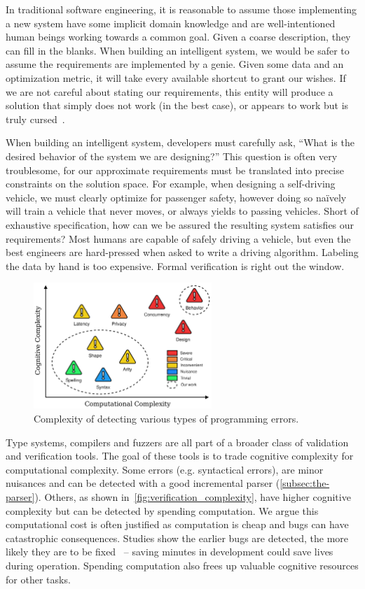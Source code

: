 In traditional software engineering, it is reasonable to assume those implementing a new system have some implicit domain knowledge and are well-intentioned human beings working towards a common goal. Given a coarse description, they can fill in the blanks. When building an intelligent system, we would be safer to assume the requirements are implemented by a genie. Given some data and an optimization metric, it will take every available shortcut to grant our wishes. If we are not careful about stating our requirements, this entity will produce a solution that simply does not work (in the best case), or appears to work but is truly cursed~\citep{bellman1957dynamic}.

When building an intelligent system, developers must carefully ask, ``What is the desired behavior of the system we are designing?'' This question is often very troublesome, for our approximate requirements must be translated into precise constraints on the solution space. For example, when designing a self-driving vehicle, we must clearly optimize for passenger safety, however doing so na\"ively will train a vehicle that never moves, or always yields to passing vehicles. Short of exhaustive specification, how can we be assured the resulting system satisfies our requirements? Most humans are capable of safely driving a vehicle, but even the best engineers are hard-pressed when asked to write a driving algorithm. Labeling the data by hand is too expensive. Formal verification is right out the window.

\begin{figure}
    \centering
    \includegraphics[width=0.60\textwidth]{../figures/verification_complexity.png}
    \caption{Complexity of detecting various types of programming errors.}
    \label{fig:verification_complexity}
\end{figure}

Type systems, compilers and fuzzers are all part of a broader class of validation and verification tools. The goal of these tools is to trade cognitive complexity for computational complexity. Some errors (e.g. syntactical errors), are minor nuisances and can be detected with a good incremental parser (\autoref{subsec:the-parser}). Others, as shown in~\autoref{fig:verification_complexity}, have higher cognitive complexity but can be detected by spending computation. We argue this computational cost is often justified as computation is cheap and bugs can have catastrophic consequences. Studies show the earlier bugs are detected, the more likely they are to be fixed~\citep{distefano2019scaling} -- saving minutes in development could save lives during operation. Spending computation also frees up valuable cognitive resources for other tasks.

